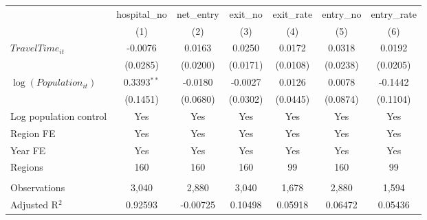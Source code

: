 \begingroup
\centering
\begin{tabular}{lcccccc}
   \toprule
                            & hospital\_no  & net\_entry  & exit\_no  & exit\_rate  & entry\_no  & entry\_rate \\    
                            & (1)           & (2)         & (3)       & (4)         & (5)        & (6)\\  
   \midrule 
   $TravelTime_{it}$        & -0.0076       & 0.0163      & 0.0250    & 0.0172      & 0.0318     & 0.0192\\   
                            & (0.0285)      & (0.0200)    & (0.0171)  & (0.0108)    & (0.0238)   & (0.0205)\\   
   $\log(Population_{it})$  & 0.3393$^{**}$ & -0.0180     & -0.0027   & 0.0126      & 0.0078     & -0.1442\\   
                            & (0.1451)      & (0.0680)    & (0.0302)  & (0.0445)    & (0.0874)   & (0.1104)\\   
   Log population control   & Yes           & Yes         & Yes       & Yes         & Yes        & Yes\\  
   Region FE                & Yes           & Yes         & Yes       & Yes         & Yes        & Yes\\  
   Year FE                  & Yes           & Yes         & Yes       & Yes         & Yes        & Yes\\  
   Regions                  & 160           & 160         & 160       & 99          & 160        & 99\\  
    \\
   Observations             & 3,040         & 2,880       & 3,040     & 1,678       & 2,880      & 1,594\\  
   Adjusted R$^2$           & 0.92593       & -0.00725    & 0.10498   & 0.05918     & 0.06472    & 0.05436\\  
   \bottomrule
\end{tabular}
\par\endgroup

